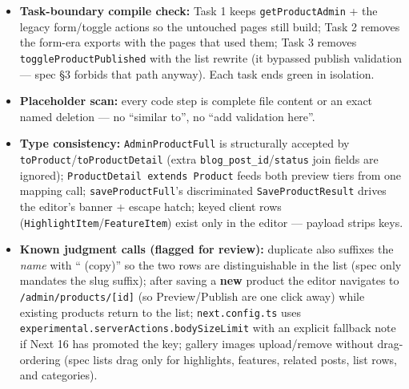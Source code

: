 \documentclass[11pt,a4paper]{article}
\begin{document}
\begin{itemize}
        \texttt{/admin/products}; no \texttt{service\_role}; Conventional Commits; green bar closes every
        task.
  \item \textbf{Task-boundary compile check:} Task 1 keeps \texttt{getProductAdmin} + the legacy
        form/toggle actions so the untouched pages still build; Task 2 removes the form-era exports with
        the pages that used them; Task 3 removes \texttt{toggleProductPublished} with the list rewrite
        (it bypassed publish validation --- spec \S3 forbids that path anyway). Each task ends green in
        isolation.
  \item \textbf{Placeholder scan:} every code step is complete file content or an exact named deletion ---
        no ``similar to'', no ``add validation here''.
  \item \textbf{Type consistency:} \texttt{AdminProductFull} is structurally accepted by
        \texttt{toProduct}/\texttt{toProductDetail} (extra \texttt{blog\_post\_id}/\texttt{status} join
        fields are ignored); \texttt{ProductDetail extends Product} feeds both preview tiers from one
        mapping call; \texttt{saveProductFull}'s discriminated \texttt{SaveProductResult} drives the
        editor's banner + escape hatch; keyed client rows (\texttt{HighlightItem}/\texttt{FeatureItem})
        exist only in the editor --- payload strips keys.
  \item \textbf{Known judgment calls (flagged for review):} duplicate also suffixes the \textit{name} with
        `` (copy)'' so the two rows are distinguishable in the list (spec only mandates the slug suffix);
        after saving a \textbf{new} product the editor navigates to \texttt{/admin/products/[id]} (so
        Preview/Publish are one click away) while existing products return to the list;
        \texttt{next.config.ts} uses \texttt{experimental.serverActions.bodySizeLimit} with an explicit
        fallback note if Next 16 has promoted the key; gallery images upload/remove without drag-ordering
        (spec lists drag only for highlights, features, related posts, list rows, and categories).
\end{itemize}
\end{document}
